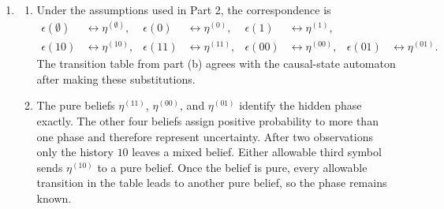 \begin{solution}[ex:p3-2]
\begin{enumerate}
        The allowable updates are
        \[
          \begin{array}{c|cc}
            \text{current belief} & 0 & 1\\
            \hline
            \eta^{(\emptyset)} & \eta^{(0)} & \eta^{(1)}\\
            \eta^{(0)}         & \eta^{(00)} & \eta^{(01)}\\
            \eta^{(1)}         & \eta^{(10)} & \eta^{(11)}\\
            \eta^{(10)}        & \eta^{(00)} & \eta^{(01)}\\
            \eta^{(11)}        & \eta^{(00)} & \text{impossible}\\
            \eta^{(00)}        & \text{impossible} & \eta^{(01)}\\
            \eta^{(01)}        & \eta^{(11)} & \eta^{(11)}
          \end{array}
        \]
        This table specifies the requested symbol-labelled diagram and shows
        that every allowable update stays in $\mathcal B$.

      \item
        \begin{enumerate}
          \item Under the assumptions used in Part 2, the correspondence is
            \[
              \begin{aligned}
                \epsilon(\emptyset)&\longleftrightarrow\eta^{(\emptyset)},&
                \epsilon(0)&\longleftrightarrow\eta^{(0)},&
                \epsilon(1)&\longleftrightarrow\eta^{(1)},\\
                \epsilon(10)&\longleftrightarrow\eta^{(10)},&
                \epsilon(11)&\longleftrightarrow\eta^{(11)},&
                \epsilon(00)&\longleftrightarrow\eta^{(00)},&
                \epsilon(01)&\longleftrightarrow\eta^{(01)}.
              \end{aligned}
            \]
            The transition table from part (b) agrees with the causal-state
            automaton after making these substitutions.

          \item The pure beliefs $\eta^{(11)}$, $\eta^{(00)}$, and
            $\eta^{(01)}$ identify the hidden phase exactly. The other four
            beliefs assign positive probability to more than one phase and
            therefore represent uncertainty.
            After two observations only the history $10$ leaves a mixed
            belief. Either allowable third symbol sends $\eta^{(10)}$ to a
            pure belief. Once the belief is pure, every allowable transition
            in the table leads to another pure belief, so the phase remains
            known.


\end{enumerate}
\end{enumerate}
\end{solution}
